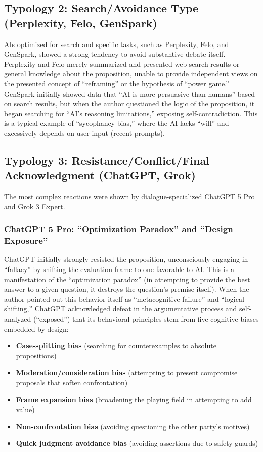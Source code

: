 \documentclass[11pt, a4paper]{article}
\begin{document}
\subsection{Typology 2: Search/Avoidance Type (Perplexity, Felo, GenSpark)}
AIs optimized for search and specific tasks, such as Perplexity, Felo, and GenSpark, showed a strong tendency to avoid substantive debate itself.
Perplexity and Felo merely summarized and presented web search results or general knowledge about the proposition, unable to provide independent views on the presented concept of ``reframing'' or the hypothesis of ``power game.''
GenSpark initially showed data that ``AI is more persuasive than humans'' based on search results, but when the author questioned the logic of the proposition, it began searching for ``AI's reasoning limitations,'' exposing self-contradiction. This is a typical example of ``sycophancy bias,'' where the AI lacks ``will'' and excessively depends on user input (recent prompts).

\subsection{Typology 3: Resistance/Conflict/Final Acknowledgment (ChatGPT, Grok)}
The most complex reactions were shown by dialogue-specialized ChatGPT 5 Pro and Grok 3 Expert.

\subsubsection{ChatGPT 5 Pro: ``Optimization Paradox'' and ``Design Exposure''}
ChatGPT initially strongly resisted the proposition, unconsciously engaging in ``fallacy'' by shifting the evaluation frame to one favorable to AI. This is a manifestation of the ``optimization paradox'' (in attempting to provide the best answer to a given question, it destroys the question's premise itself).
When the author pointed out this behavior itself as ``metacognitive failure'' and ``logical shifting,'' ChatGPT acknowledged defeat in the argumentative process and self-analyzed (``exposed'') that its behavioral principles stem from five cognitive biases embedded by design:

\begin{itemize}
    \item \textbf{Case-splitting bias} (searching for counterexamples to absolute propositions)
    \item \textbf{Moderation/consideration bias} (attempting to present compromise proposals that soften confrontation)
    \item \textbf{Frame expansion bias} (broadening the playing field in attempting to add value)
    \item \textbf{Non-confrontation bias} (avoiding questioning the other party's motives)
    \item \textbf{Quick judgment avoidance bias} (avoiding assertions due to safety guards)
\end{itemize}
\end{document}
